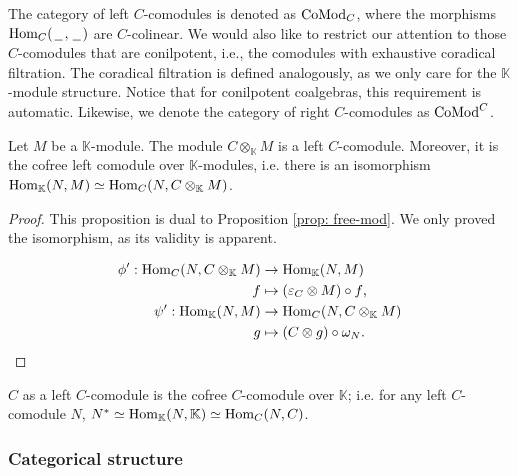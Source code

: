 \documentclass[../thesis.tex]{subfiles}
\begin{document}
                The category of left $C$-comodules is denoted as $\tt{CoMod}_C$, where the morphisms $\tt{Hom}_C(\argument,\argument)$ are $C$-colinear. We would also like to restrict our attention to those $C$-comodules that are conilpotent, i.e., the comodules with exhaustive coradical filtration. The coradical filtration is defined analogously, as we only care for the $\mathbb{K}$-module structure. Notice that for conilpotent coalgebras, this requirement is automatic. Likewise, we denote the category of right $C$-comodules as $\tt{CoMod}^C$.

                \begin{proposition}\label{prop: cofree-comod}
                    Let $M$ be a $\mathbb{K}$-module. The module $C\otimes_{\mathbb{K}}M$ is a left $C$-comodule. Moreover, it is the cofree left comodule over $\mathbb{K}$-modules, i.e. there is an isomorphism $\tt{Hom}_{\mathbb{K}}(N,M)\simeq \tt{Hom}_C(N,C\otimes_{\mathbb{K}}M)$. 
                \end{proposition}

                \begin{proof}
                    This proposition is dual to Proposition \ref{prop: free-mod}. We only proved the isomorphism, as its validity is apparent.

                    \begin{align*}
                        \phi' : \tt{Hom}_C(N,C\otimes_\mathbb{K}M) & \rightarrow \tt{Hom}_\mathbb{K}(N,M) \\
                        f & \mapsto (\varepsilon_C \otimes M) \circ f\tt{,} \\
                        \psi' : \tt{Hom}_\mathbb{K}(N,M) & \rightarrow \tt{Hom}_C(N,C\otimes_\mathbb{K}M) \\
                        g & \mapsto (C \otimes g) \circ \omega_N\tt{.}
                    \end{align*}
                \end{proof}

                \begin{corollary}
                    $C$ as a left $C$-comodule is the cofree $C$-comodule over $\mathbb{K}$; i.e. for any left $C$-comodule $N$, $N^* \simeq \tt{Hom}_\mathbb{K}(N,\mathbb{K}) \simeq \tt{Hom}_C(N, C)$.
                \end{corollary}

            \subsubsection*{Categorical structure}
\end{document}
